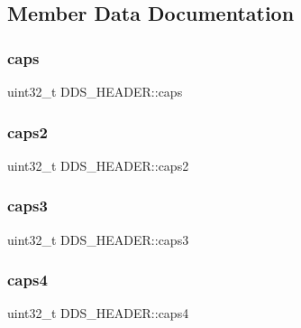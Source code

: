 \subsection{Member Data Documentation}
\hypertarget{struct_d_d_s___h_e_a_d_e_r_abe6a0e77831687e848375587e992046a}{}\label{struct_d_d_s___h_e_a_d_e_r_abe6a0e77831687e848375587e992046a} 
\subsubsection{\texorpdfstring{caps}{caps}}
{\footnotesize\ttfamily uint32\+\_\+t D\+D\+S\+\_\+\+H\+E\+A\+D\+E\+R\+::caps}

\hypertarget{struct_d_d_s___h_e_a_d_e_r_aaeb2d711eeae0d04523ef4786a1120fa}{}\label{struct_d_d_s___h_e_a_d_e_r_aaeb2d711eeae0d04523ef4786a1120fa} 
\subsubsection{\texorpdfstring{caps2}{caps2}}
{\footnotesize\ttfamily uint32\+\_\+t D\+D\+S\+\_\+\+H\+E\+A\+D\+E\+R\+::caps2}

\hypertarget{struct_d_d_s___h_e_a_d_e_r_a922da2c168f35e78ba99fe7d4350b422}{}\label{struct_d_d_s___h_e_a_d_e_r_a922da2c168f35e78ba99fe7d4350b422} 
\subsubsection{\texorpdfstring{caps3}{caps3}}
{\footnotesize\ttfamily uint32\+\_\+t D\+D\+S\+\_\+\+H\+E\+A\+D\+E\+R\+::caps3}

\hypertarget{struct_d_d_s___h_e_a_d_e_r_a82a00dd554e8212cb5a002b1970b225c}{}\label{struct_d_d_s___h_e_a_d_e_r_a82a00dd554e8212cb5a002b1970b225c} 
\subsubsection{\texorpdfstring{caps4}{caps4}}
{\footnotesize\ttfamily uint32\+\_\+t D\+D\+S\+\_\+\+H\+E\+A\+D\+E\+R\+::caps4}

